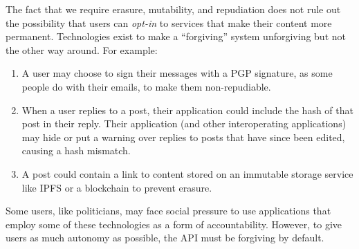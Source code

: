 The fact that we require erasure, mutability, and repudiation does not rule
out the possibility that users can \emph{opt-in} to services that make their content more permanent.
Technologies exist to make a ``forgiving'' system unforgiving but not the other way around.
For example:
\begin{enumerate}
\item
A user may choose to sign their messages with a PGP signature,
as some people do with their emails, to make them non-repudiable.
\item
When a user replies to a post, their application could include the hash
of that post in their reply. Their application (and other interoperating applications)
may hide or put a warning over replies to posts that have since been edited,
causing a hash mismatch.
\item
A post could contain a link to content stored on an immutable storage service like IPFS
or a blockchain to prevent erasure.
\end{enumerate}
Some users, like politicians, may face social pressure to use applications
that employ some of these technologies as a form of accountability.
However, to give users as much autonomy as possible, the API must be forgiving by default.
